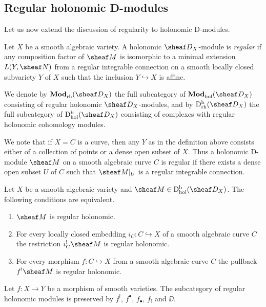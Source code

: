 \documentclass[number-in-sections,a4paper]{notes}
\begin{document}
\subsection{Regular holonomic D-modules}

Let us now extend the discussion of regularity to holonomic D-modules.

\begin{Definition}
    Let $X$ be a smooth algebraic variety.
    A holonomic $\sD_X$-module is \emph{regular} if any composition factor of $\sheaf M$ is isomorphic to a minimal extension $L(Y,\sheaf N)$ from a regular integrable connection on a smooth locally closed subvariety $Y$ of $X$ such that the inclusion $Y \hookrightarrow X$ is affine.

    We denote by $\catDModrh{X}$ the full subcategory of $\catDModhol{X}$ consisting of regular holonomic $\sD_X$-modules, and by $\catDbDModrh{X}$ the full subcategory of $\catDbDModhol{X}$ consisting of complexes with regular holonomic cohomology modules.
\end{Definition}

We note that if $X = C$ is a curve, then any $Y$ as in the definition above consists either of a collection of points or a dense open subset of $X$.
Thus a holonomic D-module $\sheaf M$ on a smooth algebraic curve $C$ is regular if there exists a dense open subset $U$ of $C$ such that $\res{\sheaf M}U$ is a regular integrable connection.

\begin{Theorem}
    Let $X$ be a smooth algebraic variety and $\sheaf M \in \catDbDModhol{X}$.
    The following conditions are equivalent.
    \begin{enumerate}
        \item $\sheaf M$ is regular holonomic.
        \item For every locally closed embedding $i_C\colon C \hookrightarrow X$ of a smooth algebraic curve $C$ the restriction $i_C^!\sheaf M$ is regular holonomic.
        \item For every morphism $f\colon C \hookrightarrow X$ from a smooth algebraic curve $C$ the pullback $f^!\sheaf M$ is regular holonomic.
    \end{enumerate}
\end{Theorem}

\begin{Theorem}
    Let $f\colon X \to Y$ be a morphism of smooth varieties.
    The subcategory of regular holonomic modules is preserved by $f^!$, $f^\bullet$, $f_\bullet$, $f_!$ and $\DD$.
\end{Theorem}
\end{document}
